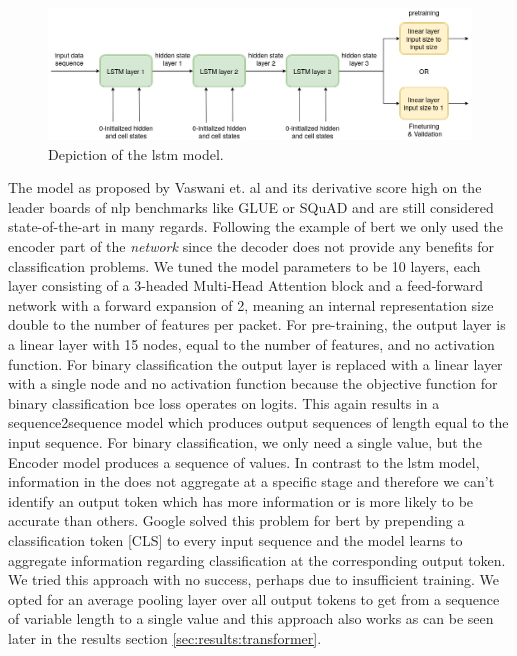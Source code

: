 \begin{figure}[h]
	\centering
	\includegraphics[width=0.95\linewidth]{graphics/img/lstm_model.png}
	\caption{Depiction of the \gls{lstm} model.}
	\label{fig:lstm_model}
\end{figure}

The  model as proposed by Vaswani et. al \cite{attention} and its derivative score high on the leader boards of \gls{nlp} benchmarks like GLUE \cite{glue} or SQuAD \cite{squad} and are still considered state-of-the-art in many regards. Following the example of \gls{bert} we only used the encoder part of the \textit{ network} since the decoder does not provide any benefits for classification problems. We tuned the model parameters to be 10  layers, each layer consisting of a 3-headed Multi-Head Attention block and a feed-forward network with a forward expansion of 2, meaning an internal representation size double to the number of features per packet. For pre-training, the output layer is a linear layer with 15 nodes, equal to the number of features, and no activation function. For binary classification the output layer is replaced with a linear layer with a single node and no activation function because the objective function for binary classification \gls{bce} loss operates on logits. This again results in a sequence2sequence model which produces output sequences of length equal to the input sequence. For binary classification, we only need a single value, but the  Encoder model produces a sequence of values. In contrast to the \gls{lstm} model, information in the  does not aggregate at a specific stage and therefore we can't identify an output token which has more information or is more likely to be accurate than others. Google solved this problem for \gls{bert} by prepending a classification token [CLS] to every input sequence and the model learns to aggregate information regarding classification at the corresponding output token. We tried this approach with no success, perhaps due to insufficient training. We opted for an average pooling layer over all output tokens to get from a sequence of variable length to a single value and this approach also works as can be seen later in the results section \ref{sec:results:transformer}.

